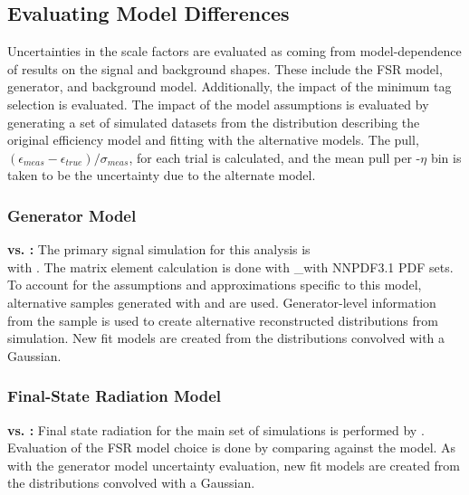 \subsection{Evaluating Model Differences}
Uncertainties in the scale factors are evaluated as coming from model-dependence of results on the signal and background shapes. These include the FSR model, generator, and background model. Additionally, the impact of the minimum tag selection \pt is evaluated. 
The impact of the model assumptions is evaluated by generating a set of simulated datasets from the \mll distribution describing the original efficiency model and fitting with the alternative models. The pull, $ (\epsilon_{meas}-\epsilon_{true})/{\sigma_{meas}} $, for each trial is calculated, and the mean pull per \pt-$\eta$ bin is taken to be the uncertainty due to the alternate model. 

\subsubsection{Generator Model}
\textbf{\aMCATNLO vs. \POWHEG:} The primary signal simulation for this analysis is \\\aMCATNLO with . The matrix element calculation is done with \_\aMCATNLO with NNPDF3.1 PDF sets. To account for the assumptions and approximations specific to this model, alternative samples generated with \POWHEG and  are used. Generator-level information from the \POWHEG sample is used to create alternative reconstructed \mll distributions from simulation. New fit models are created from the \POWHEG \mll distributions convolved with a Gaussian.

\subsubsection{Final-State Radiation Model}
\textbf{\PYTHIA vs. \PHOTOS:} Final state radiation for the main set of simulations is performed by . Evaluation of the FSR model choice is done by comparing \PYTHIA against the \PHOTOS model. As with the generator model uncertainty evaluation, new fit models are created from the \PHOTOS \mll distributions convolved with a Gaussian.

